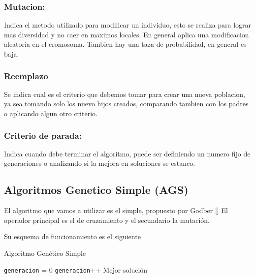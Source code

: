\subsubsection{Mutacion:} 
Indica el metodo utilizado para modificar un individuo, esto se realiza para lograr mas diversidad y no caer en maximos locales. En general aplica una modificacion aleatoria en el cromosoma.
Tambien hay una taza de probabilidad, en general es baja.

\subsubsection{Reemplazo} 
Se indica cual es el criterio que debemos tomar para crear una nueva poblacion, ya sea tomando solo los nuevo hijos creados, comparando tambien con los padres o aplicando algun otro criterio.

\subsubsection{Criterio de parada:} 
Indica cuando debe terminar el algoritmo, puede ser definiendo un numero fijo de generaciones o analizando si la mejora en soluciones se estanco.

\subsection{Algoritmos Genetico Simple (AGS)}

El algoritmo que vamos a utilizar es el simple, propuesto por Godber [] 
El operador principal es el de cruzamiento y el secundario la mutación.

Su esquema de funcionamiento es el siguiente


\begin{algorithm}%
	\caption{Algoritmo Genético Simple}
	\label{alg:algoritmo_genetico_simple}
	\begin{algorithmic} [1] 
		{
			\STATE \texttt{generacion} = 0
			\STATE \texttt{generacion}++
			\ENDWHILE
			\RETURN Mejor solución
		}
	\end{algorithmic}
\end{algorithm}




